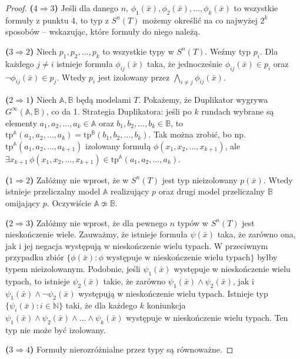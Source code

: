 \documentclass{article}
\newcommand{\N}{\mathbb{N}}
\newcommand{\A}{\mathbb{A}}
\newcommand{\B}{\mathbb{B}}
\theoremstyle{plain}
\theoremstyle{definition}
\theoremstyle{remark}
\begin{document}
\begin{proof}
	\textbf{($4 \Rightarrow 3$)} Jeśli dla danego $n$, $\phi_1(\bar{x}),
	\phi_2(\bar{x}), \ldots, \phi_k(\bar{x})$ to wszystkie formuły z punktu
	4, to typ z $S^n(T)$ możemy określić na co najwyżej $2^k$ sposobów --
	wskazując, które formuły do niego należą.

	\textbf{($3 \Rightarrow 2$)} Niech $p_1, p_2, \ldots, p_k$ to wszystkie
	typy w $S^n(T)$. Weźmy typ $p_i$. Dla każdego $j \neq i$ istnieje
	formuła $\phi_{ij}(\bar{x})$ taka, że jednocześnie $\phi_{ij}(\bar{x})
	\in p_i$ oraz $\neg \phi_{ij}(\bar{x}) \in p_j$. Wtedy $p_i$ jest
	izolowany przez $\bigwedge_{i \neq j} \phi_{ij}(\bar{x})$.

	\textbf{($2 \Rightarrow 1$)} Niech $\A, \B$ będą modelami $T$.
	Pokażemy, że Duplikator wygrywa $G^{\infty}(\A, \B)$, co da 1.
	Strategia Duplikatora:
	jeśli po $k$ rundach wybrane są elementy $a_1, a_2, \ldots, a_k \in \A$
	oraz $b_1, b_2, \ldots, b_k \in \B$, to $\text{tp}^{\A}(a_1, a_2,
	\ldots, a_k) = \text{tp}^{\B}(b_1, b_2, \ldots, b_k)$.
	Tak można zrobić, bo np. $\text{tp}^{\A}(a_1, a_2, \ldots, a_{k+1})$
	izolowany formułą
	$\phi(x_1, x_2, \ldots, x_{k+1})$, ale $\exists x_{k+1} \, \phi(x_1,
	x_2, \ldots, x_{k+1}) \in \text{tp}^{\A}(a_1, a_2, \ldots, a_k)$.

	\textbf{($1 \Rightarrow 2$)} Załóżmy nie wprost, że w $S^n(T)$ jest typ
	nieizolowany $p(\bar{x})$. Wtedy istnieje przeliczalny model $\A$
	realizujący $p$ oraz drugi model przeliczalny $\B$ omijający $p$.
	Oczywiście $\A \not \simeq \B$.

	\textbf{($2 \Rightarrow 3$)}
	Załóżmy nie wprost, że dla pewnego $n$ typów w $S^n(T)$ jest
	nieskończenie wiele. Zauważmy, że istnieje formuła $\psi(\bar{x})$
	taka, że zarówno ona, jak i jej negacja występują w nieskończenie wielu
	typach. W przeciwnym przypadku zbiór $\{\phi(\bar{x}) \colon \phi
	\text{ występuje w nieskończenie wielu typach}\}$ byłby typem
	nieizolowanym. Podobnie, jeśli $\psi_1(\bar{x})$ występuje w
	nieskończenie wielu typach, to istnieje $\psi_2(\bar{x})$ takie, że
	zarówno $\psi_1(\bar{x})\wedge \psi_2(\bar{x})$, jak i
	$\psi_1(\bar{x})\wedge \neg \psi_2(\bar{x})$ występują w nieskończenie
	wielu typach. Istnieje typ $\{\psi_i(\bar{x}) \colon i \in \N\}$ taki,
	że dla każdego $k $ koniunkcja $\psi_1(\bar{x}) \wedge \psi_2(\bar{x})
	\wedge \ldots \wedge \psi_k(\bar{x})$ występuje w nieskończenie wielu
	typach. Ten typ nie może być izolowany.

	\textbf{($3 \Rightarrow 4$)}
	Formuły nierozróżnialne przez typy są równoważne.
\end{proof}
\end{document}
